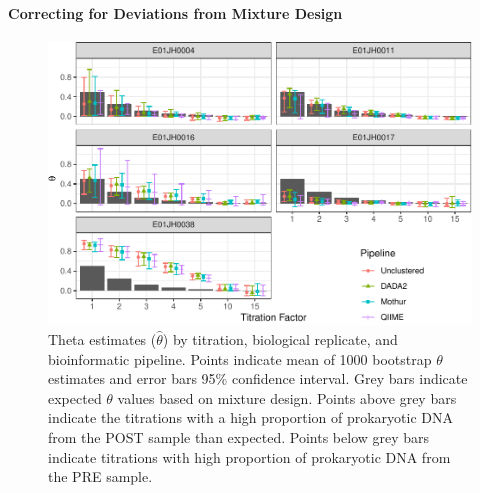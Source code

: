 \documentclass[12pt]{article}
\begin{document}
\paragraph*{Correcting for Deviations from Mixture Design}

\begin{figure}
\centering
\includegraphics[width=0.9\linewidth]{thetaHat-1.pdf}
\caption{\label{fig:thetaHat}Theta estimates (\(\hat{\theta}\)) by titration, biological
replicate, and bioinformatic pipeline. Points indicate mean
of 1000 bootstrap \(\theta\) estimates and error bars 95\% confidence
interval. Grey bars indicate expected \(\theta\) values based on mixture design.
Points above grey bars indicate the titrations with a high proportion of prokaryotic DNA
from the POST sample than expected. Points below grey bars indicate titrations
with high proportion of prokaryotic DNA from the PRE sample.}
\end{figure}
\end{document}
